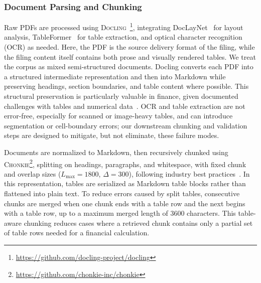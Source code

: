 \documentclass[final,5p,times,twopage,twocolumn,a4paper]{elsarticle}
\begin{document}
\subsubsection{Document Parsing and Chunking}  
Raw PDFs are processed using \textsc{Docling}~\cite{auer2024docling}\footnote{\url{https://github.com/docling-project/docling}}, integrating DocLayNet~\cite{pfitzmann2022doclaynet} for layout analysis, TableFormer~\cite{nassar2022tableformer} for table extraction, and optical character recognition (OCR) as needed. Here, the PDF is the source delivery format of the filing, while the filing content itself contains both prose and visually rendered tables. We treat the corpus as mixed semi-structured documents. Docling converts each PDF into a structured intermediate representation and then into Markdown while preserving headings, section boundaries, and table content where possible. This structural preservation is particularly valuable in finance, given documented challenges with tables and numerical data~\cite{iaroshev2024evaluating,setty2024improving,shah2024multi}. OCR and table extraction are not error-free, especially for scanned or image-heavy tables, and can introduce segmentation or cell-boundary errors; our downstream chunking and validation steps are designed to mitigate, but not eliminate, these failure modes.

Documents are normalized to Markdown, then recursively chunked using \textsc{Chonkie}\footnote{\url{https://github.com/chonkie-inc/chonkie}}, splitting on headings, paragraphs, and whitespace, with fixed chunk and overlap sizes ($L_\text{max}=1800$, $\Delta=300$), following industry best practices~\cite{merrick2024arctic}. In this representation, tables are serialized as Markdown table blocks rather than flattened into plain text. To reduce errors caused by split tables, consecutive chunks are merged when one chunk ends with a table row and the next begins with a table row, up to a maximum merged length of 3600 characters. This table-aware chunking reduces cases where a retrieved chunk contains only a partial set of table rows needed for a financial calculation.
\end{document}
